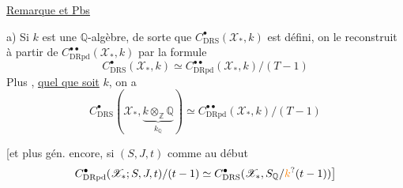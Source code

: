 \uline{Remarque et Pbs}

a) Si $k$ est une $\mathbb Q$-algèbre, de sorte que $C^\bullet_{\mathrm{DRS}}(\mathscr X_{\ast},k)$ est défini, on le reconstruit à partir de $C^{\bullet\bullet}_{\mathrm{DRpd}}(\mathscr X_{\ast},k)$  par la formule
\[
C^\bullet_{\mathrm{DRS}}(\mathscr X_\ast,k)\simeq C^{\bullet\bullet}_{\mathrm{DRpd}}(\mathscr X_\ast,k)/(T-1)
\]
Plus , \uline{quel que soit} $k$, on a
\[
C^\bullet_{\mathrm{DRS}}(\mathscr X_\ast,\underbrace{k\otimes_{\mathbb Z}\mathbb Q}_{k_{\mathbb Q}})\simeq C^{\bullet\bullet}_{\mathrm{DRpd}}(\mathscr X_\ast,k)/(T-1)
\]

[et plus gén. encore, si $(S,J,t)$ comme au début
\[
C^\bullet_{\mathrm{DRpd}}(\mathscr X_{\ast};S,J,t)/(t-1)\simeq C^\bullet_{\mathrm{DRS}}(\mathscr X_\ast,S_{\mathbb Q}/\unsure{k} (t-1))\big]
\]

